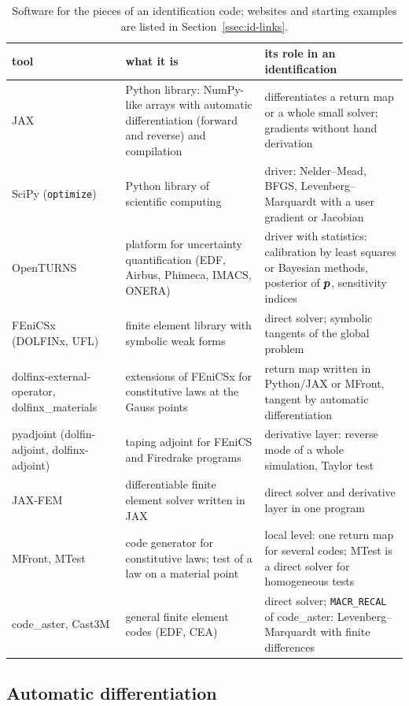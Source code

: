 \begin{table}[h]
\centering\small
\renewcommand{\arraystretch}{1.2}
\begin{tabular}{@{}>{\raggedright}p{2.6cm}>{\raggedright}p{5.4cm}>{\raggedright\arraybackslash}p{6.0cm}@{}}
\toprule
\sffamily tool & \sffamily what it is & \sffamily its role in an identification\\
\midrule
JAX & Python library: NumPy-like arrays with automatic differentiation (forward and reverse) and compilation & differentiates a return map or a whole small solver; gradients without hand derivation\\
SciPy (\texttt{optimize}) & Python library of scientific computing & driver: Nelder--Mead, BFGS, Levenberg--Marquardt with a user gradient or Jacobian\\
OpenTURNS & platform for uncertainty quantification (EDF, Airbus, Phimeca, IMACS, ONERA) & driver with statistics: calibration by least squares or Bayesian methods, posterior of $\bm{p}$, sensitivity indices\\
FEniCSx (DOLFINx, UFL) & finite element library with symbolic weak forms & direct solver; symbolic tangents of the global problem\\
dolfinx-external-operator, dolfinx\_materials & extensions of FEniCSx for constitutive laws at the Gauss points & return map written in Python/JAX or MFront, tangent by automatic differentiation\\
pyadjoint (dolfin-adjoint, dolfinx-adjoint) & taping adjoint for FEniCS and Firedrake programs & derivative layer: reverse mode of a whole simulation, Taylor test\\
JAX-FEM & differentiable finite element solver written in JAX & direct solver and derivative layer in one program\\
MFront, MTest & code generator for constitutive laws; test of a law on a material point & local level: one return map for several codes; MTest is a direct solver for homogeneous tests\\
code\_aster, Cast3M & general finite element codes (EDF, CEA) & direct solver; \texttt{MACR\_RECAL} of code\_aster: Levenberg--Marquardt with finite differences\\
\bottomrule
\end{tabular}
\caption{Software for the pieces of an identification code; websites and
starting examples are listed in Section~\ref{ssec:id-links}.}
\label{tab:id-tools}
\end{table}

\subsection{Automatic differentiation}
%
